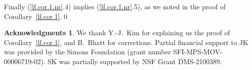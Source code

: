 \documentclass{amsart}
\theoremstyle{definition}
\newtheorem*{ack}{Acknowledgments}      %
\theoremstyle{remark}
\begin{document}
Finally (\ref{lf.cor.1.nr}.4) implies (\ref{lf.cor.1.nr}.5),  as we noted in the proof of Corollary~\ref{lf.cor.1}.\qed
    

 \begin{ack}  We thank  
  Y.-J.~Kim for explaining us the proof  of Corollary~\ref{lf.cor.1}, and B.~Bhatt for corrections.
  Partial  financial support   to JK  was provided   by the Simons Foundation   (grant number SFI-MPS-MOV-00006719-02).
  SK was partially supported by NSF Grant DMS-2100389.
    \end{ack}



 \def\cprime{$'$} \def\cprime{$'$} \def\cprime{$'$} \def\cprime{$'$}
  \def\cprime{$'$} \def\dbar{\leavevmode\hbox to 0pt{\hskip.2ex
  \accent"16\hss}d} \def\cprime{$'$} \def\cprime{$'$}
  \def\polhk#1{\setbox0=\hbox{#1}{\ooalign{\hidewidth
  \lower1.5ex\hbox{`}\hidewidth\crcr\unhbox0}}} \def\cprime{$'$}
  \def\cprime{$'$} \def\cprime{$'$} \def\cprime{$'$}
  \def\polhk#1{\setbox0=\hbox{#1}{\ooalign{\hidewidth
  \lower1.5ex\hbox{`}\hidewidth\crcr\unhbox0}}} \def\cdprime{$''$}
  \def\cprime{$'$} \def\cprime{$'$} \def\cprime{$'$} \def\cprime{$'$}
\providecommand{\bysame}{\leavevmode\hbox to3em{\hrulefill}\thinspace}
\providecommand{\MR}{\relax\ifhmode\unskip\space\fi MR }
\providecommand{\MRhref}[2]{%
  \href{http://www.ams.org/mathscinet-getitem?mr=#1}{#2}
}
\providecommand{\href}[2]{#2}
\end{document}
